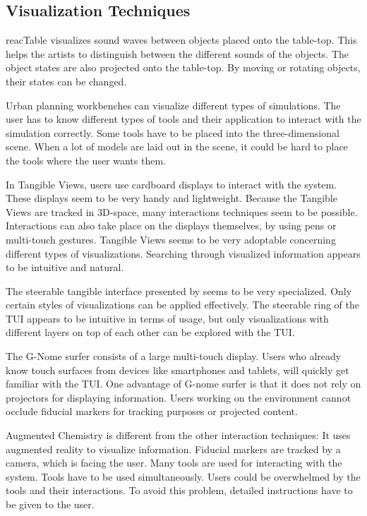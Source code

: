 \subsection{Visualization Techniques}
reacTable visualizes sound waves between objects placed onto the table-top. This helps the artists to distinguish between the different sounds of the objects. The object states are also projected onto the table-top. By moving or rotating objects, their states can be changed.

Urban planning workbenches can visualize different types of simulations. The user has to know different types of tools and their application to interact with the simulation correctly. Some tools have to be placed into the three-dimensional scene. When a lot of models are laid out in the scene, it could be hard to place the tools where the user wants them. 

In Tangible Views, users use cardboard displays to interact with the system. These displays seem to be very handy and lightweight. Because the Tangible Views are tracked in 3D-space, many interactions techniques seem to be possible. Interactions can also take place on the displays themselves, by using pens or multi-touch gestures. Tangible Views seems to be very adoptable concerning different types of visualizations. Searching through visualized information appears to be intuitive and natural. 

The steerable tangible interface presented by \cite{lee09} seems to be very specialized. Only certain styles of visualizations can be applied effectively. The steerable ring of the TUI appears to be intuitive in terms of usage, but only visualizations with different layers on top of each other can be explored with the TUI. 

The G-Nome surfer consists of a large multi-touch display. Users who already know touch surfaces from devices like smartphones and tablets, will quickly get familiar with the TUI. One advantage of G-nome surfer is that it does not rely on projectors for displaying information. Users working on the environment cannot occlude fiducial markers for tracking purposes or projected content. 

Augmented Chemistry is different from the other interaction techniques: It uses augmented reality to visualize information. Fiducial markers are tracked by a camera, which is facing the user. Many tools are used for interacting with the system. Tools have to be used simultaneously. Users could be overwhelmed by the tools and their interactions. To avoid this problem, detailed instructions have to be given to the user. 